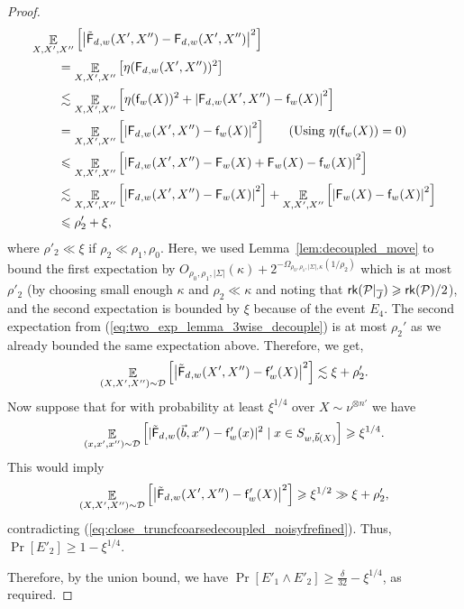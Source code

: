 \documentclass[10pt,a4paper]{amsart}
\newcommand\card[1]{\left| {#1} \right|}
\newcommand\Expect[2]{{\mathop{\mathbb{E}}_{#1}\left[ {#2} \right]}}
\renewcommand\geq{\geqslant}
\renewcommand\leq{\leqslant}
\newcommand{\V}[1]{{#1}}
\begin{document}
\begin{proof}
\begingroup
\allowdisplaybreaks
\begin{align*}
    &\Expect{X, X', X''}{\card{\truncfcoarsedecoupled_{, \V w}(X',X'') - \fcoarsedecoupled_{, \V w}(X',X'')}^2} \\
    & \quad\quad=  \Expect{X, X', X''}{\eta(\fcoarsedecoupled_{, \V w}(X',X''))^2}\\
    & \quad\quad\lesssim  \Expect{X, X', X''}{\eta(\noisyfcoarse_{\V w}(X))^2 + \card{\fcoarsedecoupled_{, \V w}(X',X'') - \noisyfcoarse_{\V w}(X)}^2} \\
    & \quad\quad =  \Expect{X, X', X''}{\card{\fcoarsedecoupled_{, \V w}(X',X'') - \noisyfcoarse_{\V w}(X)}^2} \tag*{(Using $\eta(\noisyfcoarse_{\V w}(X))=0$)}\\
   & \quad\quad\leq \Expect{X, X', X''}{\card{\fcoarsedecoupled_{, \V w}(X',X'') - \fcoarsedecomposed_{\V w}(X) + \fcoarsedecomposed_{\V w}(X) - \noisyfcoarse_{\V w}(X)}^2} \\
      & \quad\quad\lesssim  \Expect{X, X', X''}{\card{\fcoarsedecoupled_{, \V w}(X',X'') - \fcoarsedecomposed_{\V w}(X)}^2} + \Expect{X, X', X''}{\card{\fcoarsedecomposed_{\V w}(X) - \noisyfcoarse_{\V w}(X)}^2} \\
  & \quad\quad\leq \rho_2' + \xi,
\end{align*}
\endgroup
where $\rho'_2\ll \xi$ if $\rho_2 \ll \rho_1, \rho_0$. Here, we used Lemma~\ref{lem:decoupled_move} to bound the first expectation by  $O_{\rho_0, \rho_1,|\Sigma|}(\kappa) +  2^{-\Omega_{\rho_0, \rho_1,|\Sigma|, \kappa}(1/\rho_2)}$ which is at most $\rho'_2$ (by choosing small enough $\kappa$ and $\rho_2 \ll \kappa$ and noting that ${\sf rk}(\mathcal{P}|_{\overline{J}})\geq {\sf rk}(\mathcal{P})/2$), and the second expectation is bounded by $\xi$ because of the event $E_4$.
The second expectation from (\ref{eq:two_exp_lemma_3wise_decouple}) is at most $\rho_2'$ as we already bounded the same expectation above. Therefore, we get,
\begin{equation}\label{eq:close_truncfcoarsedecoupled_noisyfrefined}
\Expect{(X,X',X'')\sim \mathcal{D}}{\card{\truncfcoarsedecoupled_{,\V w}(X',X'') - \noisyfrefined_{\V w}(X)}^2}\lesssim \xi + \rho'_2.
\end{equation}
Now suppose that for with probability at least $\xi^{1/4}$ over $X\sim \nu^{\otimes n'}$ we have 
$$\Expect{(\V x, \V x', \V x'')\sim \mathcal{D}}{|\truncfcoarsedecoupled_{,\V w}(\vec{b},\V x'')  - \noisyfrefined_{\V w}(\V x)|^2 \mid \V x\in S_{\V w, \vec{b}(X)}} \geq \xi^{1/4}.$$
This would imply
$$\Expect{(X,X',X'')\sim \mathcal{D}}{\card{\truncfcoarsedecoupled_{,\V w}(X',X'') - \noisyfrefined_{\V w}(X)}^2}\geq \xi^{1/2} \gg  \xi + \rho'_2,$$
contradicting (\ref{eq:close_truncfcoarsedecoupled_noisyfrefined}). Thus, $\Pr[E'_2] \geq 1-\xi^{1/4}$.

Therefore, by the union bound, we have $\Pr[E'_1\wedge E'_2] \geq \frac{\delta}{32} - \xi^{1/4}$, as required.
\end{proof}
\end{document}
